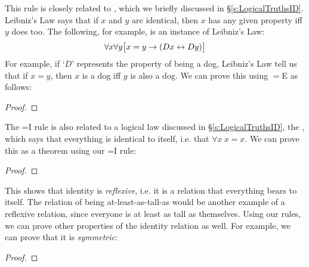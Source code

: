 This rule is closely related to , which we briefly discussed in \S\ref{s:LogicalTruthsID}. Leibniz's Law says that if $x$ and $y$ are identical, then $x$ has any given property  iff $y$ does too. The following, for example, is an instance of Leibniz's Law:
$$\forall x \forall y\bigl[x = y \rightarrow (Dx \leftrightarrow Dy)\bigr]$$
For example, if `$D$' represents the property of being a dog, Leibniz's Law tell us that if $x=y$, then $x$ is a dog iff $y$ is also a dog.  We can prove this using $=$E as follows:

\begin{proof}
\open 
	 \fl{}
	\open 
		 \fl{}
		\open
			\open 
			\close
			\open
				 
			\close
		 
		\close
	 
	\close
	 
	\close
	 
				
\end{proof}

The =I rule is also related to a logical law discussed in \S\ref{s:LogicalTruthsID}, the , which says that everything is identical to itself, i.e. that $\forall x \ x = x$.  We can prove this as a theorem using our =I rule:

\begin{proof}
\open
	 \fl{}
	 
\close
{} 
\end{proof}

This shows that identity is \emph{reflexive}, i.e. it is a relation that everything bears to itself.  The relation of being at-least-as-tall-as would be another example of a reflexive relation, since everyone is at least as tall as themselves.  Using our rules, we can prove other properties of the identity relation as well.  For example, we can prove that it is \emph{symmetric}:

\begin{proof}
\open
	 \fl{}
	\open
		 \fl{}
		\open
			 
			 
		\close
		 
	\close
	 
\close
{} 


\end{proof}


